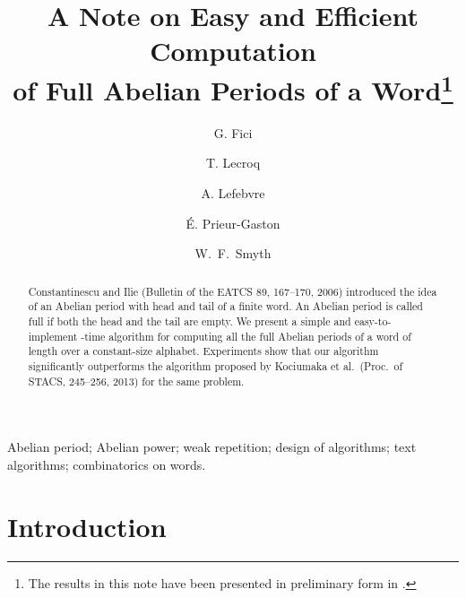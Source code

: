 \documentclass[3p]{elsarticle}
\begin{document}
\title{\textbf{A Note on Easy and Efficient Computation \\of Full Abelian Periods of a Word}\footnote{The results in this note have been presented in preliminary form in \cite{FiLeLePrSm12}.}}

\author[palermo]{G. Fici}

\author[rouen]{T. Lecroq}

\author[rouen]{A. Lefebvre}

\author[rouen]{\'E. Prieur-Gaston}

\author[mcmaster]{W.\ F.\ Smyth}

\address[palermo]{Dipartimento di Matematica e Informatica, Universit\`a di Palermo, Italy}

\address[rouen]{LITIS EA4108, Universit\'e de Rouen, 76821 Mont-Saint-Aignan Cedex, France}

\address[mcmaster]{Dept of Computing and Software, McMaster University,
Hamilton ON L8S 4K1, Canada and Faculty of Engineering \& Information Technology,
 Murdoch University, Murdoch WA 6150, Australia}

\begin{abstract}
Constantinescu and Ilie (Bulletin of the EATCS 89, 167--170, 2006) introduced the idea of an Abelian period with head and tail of a finite word. An Abelian period is called full if both the head and the tail are empty.
We present a simple and easy-to-implement -time algorithm for computing all the full Abelian periods of a word of length  over a constant-size alphabet. Experiments show that our algorithm significantly outperforms the  algorithm proposed by Kociumaka et al.~(Proc.~of STACS, 245--256, 2013) for the same problem.
\end{abstract}

\begin{keyword}
Abelian period; Abelian power; weak repetition; design
 of algorithms; text algorithms; combinatorics on words.
\end{keyword}

\maketitle

\section{Introduction}
\end{document}
